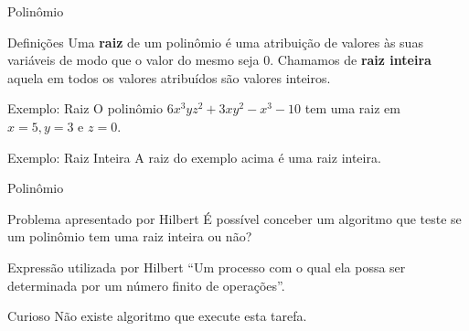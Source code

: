 \documentclass[xcolor=dvipsnames,table]{beamer}
\begin{document}
	\begin{frame}{Polinômio}
		\begin{block}{Definições}	
			Uma {\bf raiz} de um polinômio é uma atribuição de valores às suas variáveis de modo que o valor do mesmo seja 0. Chamamos de {\bf raiz inteira} aquela em todos os valores atribuídos são valores inteiros.
		\end{block}\pause
		\begin{block}{Exemplo: Raiz}
			O polinômio $6x^3 y z^2 + 3x y^2 -x^3 - 10$ tem uma raiz em $x=5, y=3$ e $z=0$.
		\end{block}\pause
		\begin{block}{Exemplo: Raiz Inteira}
			A raiz do exemplo acima é uma raiz inteira.
		\end{block}
	\end{frame}
	
	\begin{frame}{Polinômio}
		\begin{block}{Problema apresentado por Hilbert}
			É possível conceber um algoritmo que teste se um polinômio tem uma raiz inteira ou não?
		\end{block} \pause
		\begin{block}{Expressão utilizada por Hilbert}
			``Um processo com o qual ela possa ser determinada por um número finito de operações''.
		\end{block} \pause
		\begin{alertblock}{Curioso}
			Não existe algoritmo que execute esta tarefa.
		\end{alertblock}
	\end{frame}
	
\end{document}
